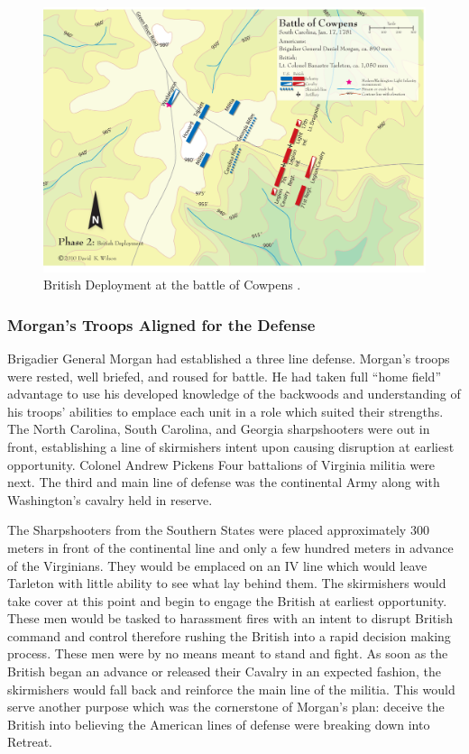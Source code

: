 \begin{figure}[h]
    \begin{center}
    \includegraphics[width=\textwidth]{gfx/beiber02}
    \end{center}
    \caption{British Deployment at the battle of Cowpens \cite{wilson_blogmap}.}
    \label{terrain1}
\end{figure}


\subsubsection{Morgan's Troops Aligned for the Defense}

Brigadier General Morgan had established a three line defense. Morgan's troops
were rested, well briefed, and roused for battle. He had taken full ``home
field'' advantage to use his developed knowledge of the backwoods and
understanding of his troops' abilities to emplace each unit in a role which
suited their strengths. The North Carolina, South Carolina, and Georgia
sharpshooters were out in front, establishing a line of skirmishers intent upon
causing disruption at earliest opportunity. Colonel Andrew Pickens Four
battalions of Virginia militia were next. The third and main line of defense
was the continental Army along with Washington's cavalry held in reserve.

The Sharpshooters from the Southern States were placed approximately 300 meters
in front of the continental line \cite[48]{moncure_cowpens_1996} and only a few
hundred meters in advance of the Virginians. They would be emplaced on an IV
line which would leave Tarleton with little ability to see what lay behind
them. The skirmishers would take cover at this point and begin to engage the
British at earliest opportunity. These men would be tasked to harassment fires
with an intent to disrupt British command and control therefore rushing the
British into a rapid decision making process. These men were by no means meant
to stand and fight.  As soon as the British began an advance or released their
Cavalry in an expected fashion, the skirmishers would fall back and reinforce
the main line of the militia. This would serve another purpose which was the
cornerstone of Morgan's plan: deceive the British into believing the American
lines of defense were breaking down into Retreat.

